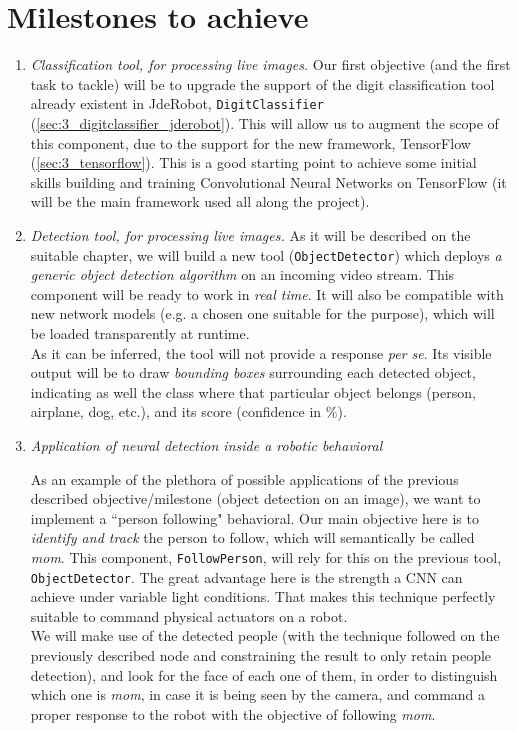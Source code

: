 \section{Milestones to achieve}
	 \begin{enumerate}
	 	\item \emph{Classification tool, for processing live images.}
			Our first objective (and the first task to tackle) will be to upgrade the support of the digit classification tool already existent in JdeRobot, \texttt{DigitClassifier} (\autoref{sec:3_digitclassifier_jderobot}). This will allow us to augment the scope of this component, due to the support for the new framework, TensorFlow (\autoref{sec:3_tensorflow}). This is a good starting point to achieve some initial skills building and training Convolutional Neural Networks on TensorFlow (it will be the main framework used all along the project).\\
		
		\item \emph{Detection tool, for processing live images.}
			As it will be described on the suitable chapter, we will build a new tool (\texttt{ObjectDetector}) which deploys \textit{a generic object detection algorithm} on an incoming video stream. This component will be ready to work in \emph{real time}. It will also be compatible with new network models (e.g. a chosen one suitable for the purpose), which will be loaded transparently at runtime.\\
			
			As it can be inferred, the tool will not provide a response \textit{per se}. Its visible output will be to draw \emph{bounding boxes} surrounding each detected object, indicating as well the class where that particular object belongs (person, airplane, dog, etc.), and its score (confidence in \%).\\
			
			
		\item \emph{Application of neural detection inside a robotic behavioral}
		
			As an example of the plethora of possible applications of the previous described objective/milestone (object detection on an image), we want to implement a ``person following" behavioral. Our main objective here is to \textit{identify and track} the person to follow, which will semantically be called \emph{mom}. This component, \texttt{FollowPerson}, will rely for this on the previous tool, \texttt{ObjectDetector}. The great advantage here is the strength a CNN can achieve under variable light conditions. That makes this technique perfectly suitable to command physical actuators on a robot.\\
			
			We will make use of the detected people (with the technique followed on the previously described node and constraining the result to only retain people detection), and look for the face of each one of them, in order to distinguish which one is \emph{mom}, in case it is being seen by the camera, and command a proper response to the robot with the objective of following \emph{mom}.\\
		\end{enumerate}

